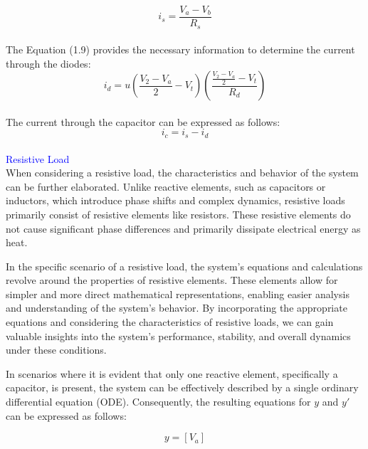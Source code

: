 \begin{equation}
    i_s=\frac{V_a-V_b}{R_s}
\end{equation}\\

The Equation (1.9) provides the necessary information to determine the current through the diodes:\\

\begin{equation}
    i_d=u(\frac{V_2-V_a}{2}-V_t)(\frac{\frac{V_2-V_a}{2}-V_t}{R_d})
\end{equation}\\

The current through the capacitor can be expressed as follows:\\

\begin{equation}
    i_c=i_s-i_d
\end{equation}\\

\Large\textcolor{blue}{Resistive Load}\\

When considering a resistive load, the characteristics and behavior of the system can be further elaborated. Unlike reactive elements, such as capacitors or inductors, which introduce phase shifts and complex dynamics, resistive loads primarily consist of resistive elements like resistors. These resistive elements do not cause significant phase differences and primarily dissipate electrical energy as heat.

In the specific scenario of a resistive load, the system's equations and calculations revolve around the properties of resistive elements. These elements allow for simpler and more direct mathematical representations, enabling easier analysis and understanding of the system's behavior. By incorporating the appropriate equations and considering the characteristics of resistive loads, we can gain valuable insights into the system's performance, stability, and overall dynamics under these conditions.

In scenarios where it is evident that only one reactive element, specifically a capacitor, is present, the system can be effectively described by a single ordinary differential equation (ODE). Consequently, the resulting equations for $y$ and $y'$ can be expressed as follows:

\begin{equation}
    y=[V_a]
\end{equation}\\

